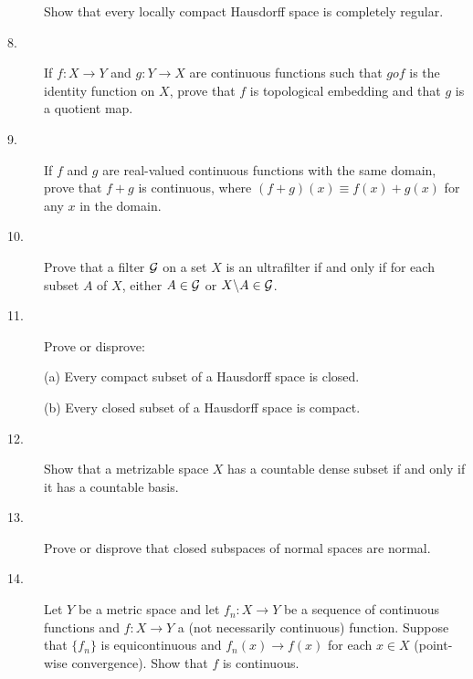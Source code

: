 \documentclass{article}
\begin{document}
\begin{description}
Show that every locally compact Hausdorff space is completely regular.

\item[8.]
If $f: X \to Y$ and $g: Y \to X$ are continuous functions such that $g o f$
is the identity function on $X$, prove that $f$ is topological embedding
and that $g$ is a quotient map.

\item[9.]
If $f$ and $g$ are real-valued continuous functions with the same domain,
prove that $f+g$ is continuous, where $(f+g) (x) \equiv f(x) + g(x)$ for
any $x$ in the domain.

\item[10.]
Prove that a filter ${\cal G}$ on a set $X$ is an ultrafilter if and only if for
each subset $A$ of $X$, either $A \in {\cal G}$ or
$X \backslash A \in {\cal G}$.

\item[11.]
Prove or disprove:

\item[\quad] (a)
Every compact subset of a Hausdorff space is closed.

\item[\quad] (b)
Every closed subset of a Hausdorff space is compact.

\item[12.]
Show that a metrizable space $X$ has a countable dense subset if and only
if it has a countable basis.

\item[13.]
Prove or disprove that closed subspaces of normal spaces are normal.

\item[14.]
Let $Y$ be a metric space and let $f_n: X \to Y$ be a sequence of continuous
functions and $f:X \to Y$ a (not necessarily continuous) function. Suppose
that $\{f_n\}$ is equicontinuous and $f_n(x) \to f(x)$ for each
$x \in X$ (point-wise convergence). Show that $f$ is continuous.







\end{description}
\end{document}
